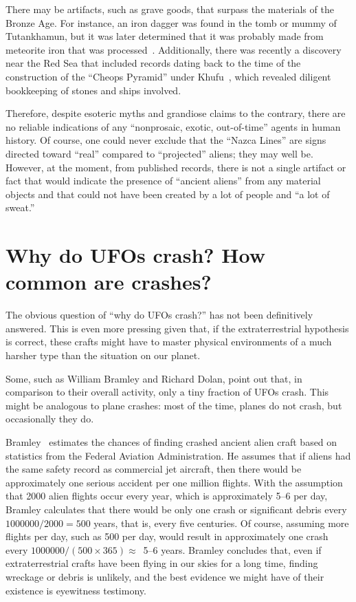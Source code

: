There may be artifacts, such as grave goods, that surpass the materials of the Bronze Age. For instance, an iron dagger was found in the tomb or mummy of Tutankhamun, but it was later determined that it was probably made from meteorite iron that was processed~\cite{Wertime1980Jan,Wertime1973Nov,Matsui2022Apr}. Additionally, there was recently a discovery near the Red Sea that included records dating back to the time of the construction of the ``Cheops Pyramid'' under Khufu~\cite{Tallet2016,Tallet2017,Tallet2021}, which revealed diligent bookkeeping of stones and ships involved.

Therefore, despite esoteric myths and grandiose claims to the contrary, there are no reliable indications of any ``nonprosaic, exotic, out-of-time'' agents in human history. Of course, one could never exclude that the ``Nazca Lines'' are signs directed toward ``real'' compared to ``projected'' aliens; they may well be. However, at the moment, from published records, there is not a single artifact or fact that would indicate the presence of ``ancient aliens'' from any material objects and that could not have been created by a lot of people and ``a lot of sweat.''



\section{Why do UFOs crash? How common are crashes?}
\label{2023-UFO-part-Perception-crash-retreivals-wduc}

The obvious question of ``why do UFOs crash?'' has not been definitively answered. This is even more pressing given that, if the extraterrestrial hypothesis is correct, these crafts might have to master physical environments of a much harsher type than the situation on our planet.

Some, such as William Bramley and Richard Dolan, point out that, in comparison to their overall activity, only a tiny fraction of UFOs crash. This might be analogous to plane crashes: most of the time, planes do not crash, but occasionally they do.

Bramley~\cite[pp.~18--19]{Bramley1993Mar} estimates the chances of finding crashed ancient alien craft based on statistics from the Federal Aviation Administration. He assumes that if aliens had the same safety record as commercial jet aircraft, then there would be approximately one serious accident per one million flights. With the assumption that 2000 alien flights occur every year, which is approximately 5--6 per day, Bramley calculates that there would be only one crash or significant debris every $1000000/2000 = 500$ years, that is, every five centuries. Of course, assuming more flights per day, such as 500 per day, would result in approximately one crash every $1000000/(500 \times 365) \approx $~5--6 years. Bramley concludes that, even if extraterrestrial crafts have been flying in our skies for a long time, finding wreckage or debris is unlikely, and the best evidence we might have of their existence is eyewitness testimony.

